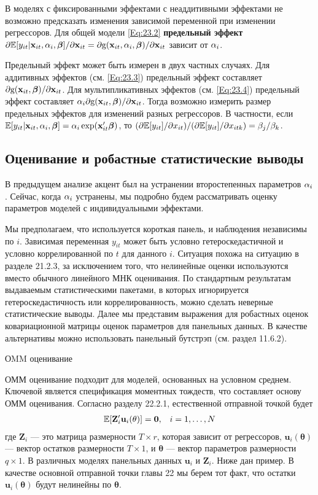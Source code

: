В моделях с фиксированными эффектами с неаддитивными эффектами  не возможно предсказать изменения зависимой переменной при изменении регрессоров. Для общей модели \ref{Eq:23.2} \textbf{предельный эффект} $\partial \mathbb{E}[y_{it}|\mathbf{x}_{it},\alpha_i,\bm{\beta}]/\partial \mathbf{x}_{it} = \partial \mathrm g(\mathbf{x}_{it}, \alpha_i, \bm{\beta})/\partial\mathbf{x}_{it}$ зависит от $\alpha_i$.

Предельный эффект может быть измерен в двух частных случаях. Для аддитивных эффектов (см. \ref{Eq:23.3}) предельный эффект составляет $\partial \mathrm g(\mathbf{x}_{it}, \bm{\beta})/\partial \mathbf{x}_{it}$. Для мультипликативных эффектов (см. \ref{Eq:23.4}) предельный эффект составляет $\alpha_i \partial \mathrm g(\mathbf{x}_{it}, \bm{\beta})/\partial \mathbf{x}_{it}$. Тогда возможно измерить размер предельных эффектов для изменений разных регрессоров. В частности, если $\mathbb{E} [y_{it}|\mathbf{x}_{it}, \alpha_i, \bm{\beta}]=\alpha_i \exp (\mathbf{x}_{it}' \bm{\beta})$, то $(\partial \mathbb{E}[y_{it}]/\partial x_{it})/(\partial \mathbb{E}[y_{it}]/\partial x_{itk}) = \beta_j/\beta_k$.

\subsection{Оценивание и робастные статистические выводы}

В предыдущем анализе акцент был на устранении второстепенных параметров $\alpha_i$. Сейчас, когда $\alpha_i$ устранены, мы подробно будем рассматривать оценку параметров моделей с индивидуальными эффектами.

Мы предполагаем, что используется короткая панель, и наблюдения независимы по $i$.
Зависимая переменная $y_{it}$ может быть условно гетероскедастичной и условно коррелированной по $t$ для данного $i$. Ситуация похожа на ситуацию в разделе 21.2.3, за исключением того, что нелинейные оценки используются вместо обычного линейного МНК оценивания. По стандартным результатам выдаваемым статистическими пакетами, в которых игнорируется гетероскедастичность или коррелированность, можно сделать неверные статистические выводы. Далее мы представим выражения для робастных оценок ковариационной матрицы оценок параметров для панельных данных. В качестве альтернативы можно использовать панельный бутстрэп (см. раздел 11.6.2).

{\centering ОMM оценивание \\}

ОММ оценивание подходит для моделей, основанных на условном среднем. Ключевой является спецификация моментных тождеств, что составляет основу ОММ оценивания. Согласно разделу 22.2.1, естественной отправной точкой будет
\begin{align}
&\mathbb{E}[\mathbf{Z}'_i \mathbf{u}_i (\mathbf{\theta})]=\mathbf{0},
&i=1, \dots, N
\label{Eq:23.24}
\end{align}
где $\mathbf{Z}_i$ --- это матрица размерности $T \times r$, которая зависит от регрессоров, $\mathbf{u}_i(\mathbf{\theta})$ --- вектор остатков размерности $T \times 1$, и $\mathbf{\theta}$ --- вектор параметров размерности  $q \times 1$. В различных моделях панельных данных $\mathbf{u}_i$ и $\mathbf{Z}_i$. Ниже дан пример. В качестве основной отправной точки главы 22 мы берем тот факт, что остатки $\mathbf{u}_i(\mathbf{\bm\theta})$ будут нелинейны по $\bm\theta$.

